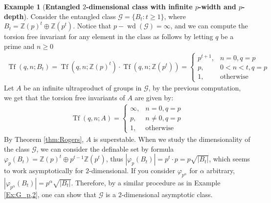 \documentclass[11pt]{amsart}
\theoremstyle{definition}
\newtheorem{ejem}[prop]{Example}
\newcommand{\bej}{\begin{ejem}}
\newcommand{\eej}{\end{ejem}}
\newcommand{\Z}{\mathbb{Z}}
\begin{document}
\bej [\textbf{Entangled $2$-dimensional class with infinite $p$-width and $p$-depth}]\label{Example:wd-infty-superstable} Consider the entangled class $\mathcal{G}=\{B_t:t\geq 1\}$, where $B_t=\mathbb{Z}(p)^t\oplus \mathbb{Z}(p^t)$. Notice that $p-\operatorname{wd}(\mathcal{G})=\infty$, and we can compute the torsion free invariant for any element in the class as follows by letting $q$ be a prime and $n\geq0$
\begin{align*}
    \operatorname{Tf}(q,n;B_t)=\operatorname{Tf}(q,n;\Z(p)^t)\cdot\operatorname{Tf}(q,n;\Z(p^t))=\begin{cases}
        p^{t+1},&n=0,q=p\\
        p,&0<n<t,q=p\\
        1,&\text{otherwise}
    \end{cases}
\end{align*}
Let $A$ be an infinite ultraproduct of groups in $\mathcal{G}$, by the previous computation, we get that the torsion free invariants of $A$ are given by:
\begin{align*}
    \operatorname{Tf}(q,n;A)=\begin{cases}
        \infty,&n=0,q=p\\
        p,&n\neq0,q=p\\
        1,&\text{otherwise}
    \end{cases}
\end{align*}
By Theorem \ref{thm:Rogers}, $A$ is superstable. When we study the dimensionality of the class $\mathcal{G}$, we can consider the definable set by formula $\varphi_p(B_t) = \Z(p)^t\oplus p^{t-1}\Z(p^t)$, thus $|\varphi_p(B_t)|=p^t\cdot p=p\sqrt{|B_t|}$, which seems to work asymptotically for $2$-dimensional. If you consider $\varphi_{p^\alpha}$ for $\alpha$ arbitrary, $|\varphi_{p^{\alpha}}(B_t)|=p^\alpha\sqrt{|B_t|}$. Therefore, by a similar procedure as in Example \ref{Ex:G_p,2}, one can show that $\mathcal{G}$ is a $2$-dimensional asymptotic class.
\eej
\end{document}
